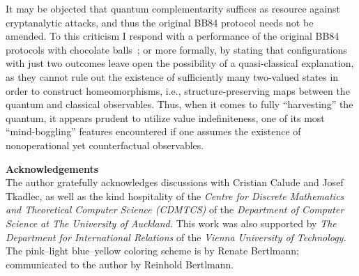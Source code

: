 \documentclass[12pt]{elsarticle}%
\begin{document}
It may be objected that quantum complementarity suffices
as resource against cryptanalytic attacks,
and thus the original BB84 protocol needs not be amended.
To this criticism I respond with a performance of the original BB84 protocols
with chocolate balls~\cite{svozil-2005-ln1e}; or more formally,
by stating that configurations with just two outcomes leave open the possibility
of a quasi-classical explanation, as they cannot rule out the existence of
sufficiently many two-valued states in order to construct homeomorphisms,
i.e.,  structure-preserving maps between the quantum and classical observables.
Thus, when it comes to fully ``harvesting'' the quantum, it appears prudent to utilize value indefiniteness,
one of its most ``mind-boggling'' features encountered if one assumes the existence of nonoperational yet counterfactual observables.


$\;$\\
{\bf Acknowledgements}
\\
The author gratefully acknowledges discussions with Cristian Calude and Josef Tkadlec, as well as the kind hospitality of the {\it Centre for Discrete Mathematics
and Theoretical Computer Science (CDMTCS)} of the {\it Department of Computer Science at
The University of Auckland.}
This work was also supported by {\it The Department for International Relations}
of the {\em Vienna University of Technology.}
The pink--light blue--yellow coloring scheme is by Renate Bertlmann; communicated to the author by Reinhold Bertlmann.


%
\end{document}
